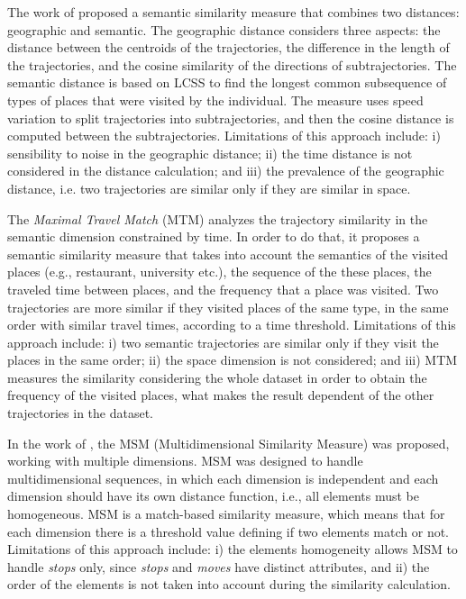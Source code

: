 The work of \cite{Liu:2012:SMM:2442968.2442971} proposed a semantic similarity measure that combines two distances: geographic and semantic. The geographic distance considers three aspects: the distance between the centroids of the trajectories, the difference in the length of the trajectories, and the cosine similarity of the directions of subtrajectories. The semantic distance is based on LCSS to find the longest common subsequence of types of places that were visited by the individual. The measure uses speed variation to split trajectories into subtrajectories, and then the cosine distance is computed between the subtrajectories. Limitations of this approach include: i) sensibility to noise in the geographic distance; ii) the time distance is not considered in the distance calculation; and iii) the prevalence of the geographic distance, i.e. two trajectories are similar only if they are similar in space.

The \emph{Maximal Travel Match} (MTM)\cite{Xiao:2010:FSU:1869790.1869857} analyzes the trajectory similarity in the semantic dimension constrained by time. In order to do that, it proposes a semantic similarity measure that takes into account the semantics of the visited places (e.g., restaurant, university etc.), the sequence of the these places, the traveled time between places, and the frequency that a place was visited. Two trajectories are more similar if they visited places of the same type, in the same order with similar travel times, according to a time threshold. Limitations of this approach include: i) two semantic trajectories are similar only if they visit the places in the same order; ii) the space dimension is not considered; and iii) MTM measures the similarity considering the whole dataset in order to obtain the frequency of the visited places, what makes the result dependent of the other trajectories in the dataset.

In the work of \cite{Furtado:TGIS12156}, the MSM (Multidimensional Similarity Measure) was proposed, working with multiple dimensions. MSM was designed to handle multidimensional sequences, in which each dimension is independent and each dimension should have its own distance function, i.e., all elements must be homogeneous. MSM is a match-based similarity measure, which means that for each dimension there is a threshold value defining if two elements match or not. Limitations of this approach include: i) the elements homogeneity allows MSM to handle \textit{stops} only, since \textit{stops} and \textit{moves} have distinct attributes, and ii) the order of the elements is not taken into account during the similarity calculation.


